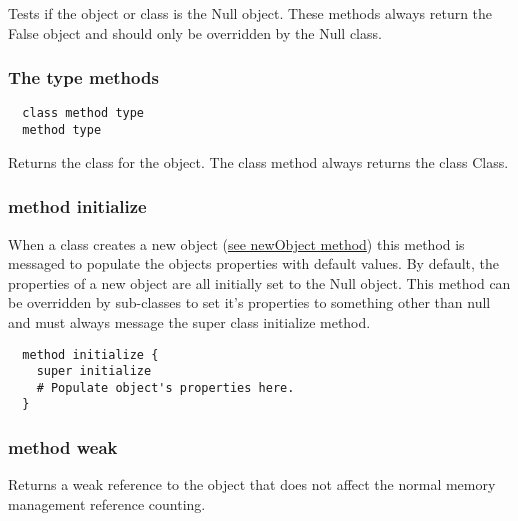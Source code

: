 Tests if the object or class is the Null object. These methods always return
the False object and should only be overridden by the Null class.

\hfill
\subsubsection {The type methods}
\begin{lstlisting}
  class method type
  method type
\end{lstlisting}

Returns the class for the object. The class method always returns the class
Class.

\hfill
\subsubsection {method initialize}
When a class creates a new object
(\hyperref[sec:class_method_newobject]{see newObject method}) this method is
messaged to populate the objects properties with default values. By
default, the properties of a new object are all initially set to the Null
object. This method can be overridden by sub-classes to set it's properties
to something other than null and must always message the super class
initialize method.

\begin{lstlisting}
  method initialize {
    super initialize
    # Populate object's properties here.
  }
\end{lstlisting}

\subsubsection {method weak}

Returns a weak reference to the object that does not affect the normal memory
management reference counting.
